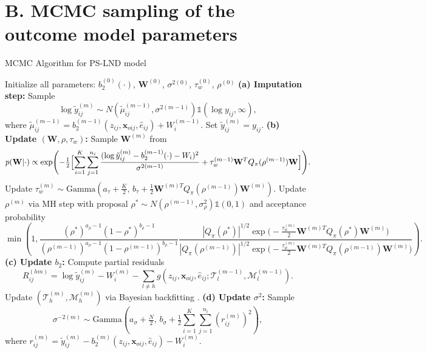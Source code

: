 \documentclass[aoas]{imsart}
\theoremstyle{plain}
\theoremstyle{definition}
\begin{document}
\newpage
\newpage


\section*{B. MCMC sampling of the outcome model parameters}



\begin{algorithm}[H]
\caption{MCMC Algorithm for PS-LND model}
\begin{algorithmic}[1]
\State Initialize all parameters: $b_2^{(0)}(\cdot)$, $\mathbf{W}^{(0)}$, $\sigma^{2(0)}$, $\tau_w^{(0)}$, $\rho^{(0)}$
    \Statex
    \State \textbf{(a) Imputation step:}
        \State Sample 
        \[
        \log \tilde{y}_{ij}^{(m)} \sim 
        N(\tilde{\mu}_{ij}^{(m-1)}, \sigma^{2(m-1)})
        \mathds{1}(\log y_{ij}, \infty),
        \]
        where $\tilde{\mu}_{ij}^{(m-1)} = b_2^{(m-1)}(z_{ij}, \mathbf{x}_{oij}, \hat{e}_{ij}) + W_i^{(m-1)}$.
    \Else
        \State Set $\tilde{y}_{ij}^{(m)} = y_{ij}$.
    \EndIf
    \Statex
    \State \textbf{(b) Update $(\mathbf{W},\rho,\tau_w)$:}
    \State Sample $\mathbf{W}^{(m)}$ from
    \[
    p(\mathbf{W}|\cdot) \propto \exp\Biggl(-\tfrac{1}{2}\Bigl[
    \sum_{i=1}^K \sum_{j=1}^{n_i} \frac{(\log \tilde{y}_{ij}^{(m)} - b_2^{(m-1)}(\cdot) - W_i)^2}{\sigma^{2(m-1)}}
    + \tau_w^{(m-1)} \mathbf{W}^T Q_\pi(\rho^{(m-1)}) \mathbf{W}
    \Bigr]\Biggr).
    \]
    \State Update $\tau_w^{(m)} \sim \text{Gamma}\!\left(a_\tau + \tfrac{K}{2},\, b_\tau + \tfrac{1}{2}\mathbf{W}^{(m)T} Q_\pi(\rho^{(m-1)}) \mathbf{W}^{(m)}\right)$.
    \State Update $\rho^{(m)}$ via MH step with proposal $\rho^* \sim N(\rho^{(m-1)}, \sigma_\rho^2)\mathds{1}(0,1)$ and acceptance probability
    \[
    \min\!\left(1, \frac{(\rho^*)^{a_\rho-1}(1-\rho^*)^{b_\rho-1}}{(\rho^{(m-1)})^{a_\rho-1}(1-\rho^{(m-1)})^{b_\rho-1}}
    \frac{|Q_\pi(\rho^*)|^{1/2} \exp\!\bigl(-\tfrac{\tau_w^{(m)}}{2}\mathbf{W}^{(m)T} Q_\pi(\rho^*) \mathbf{W}^{(m)}\bigr)}{|Q_\pi(\rho^{(m-1)})|^{1/2} \exp\!\bigl(-\tfrac{\tau_w^{(m)}}{2}\mathbf{W}^{(m)T} Q_\pi(\rho^{(m-1)}) \mathbf{W}^{(m)}\bigr)}\right).
    \]
    \Statex
    \State \textbf{(c) Update $b_2$:}
        \State Compute partial residuals
        \[
        R_{ij}^{(hm)} = \log \tilde{y}_{ij}^{(m)} - W_i^{(m)} - \sum_{l\neq h} g(z_{ij},\mathbf{x}_{oij},\hat{e}_{ij}; \mathcal{T}_l^{(m-1)}, \mathcal{M}_l^{(m-1)}).
        \]
        \State Update $(\mathcal{T}_h^{(m)},\mathcal{M}_h^{(m)})$ via Bayesian backfitting \parencite{Chipman10}.
    \EndFor
    \Statex
    \State \textbf{(d) Update $\sigma^2$:}
    \State Sample
    \[
    \sigma^{-2(m)} \sim \text{Gamma}\!\left(a_\sigma + \tfrac{N}{2},\, b_\sigma + \tfrac{1}{2}\sum_{i=1}^K\sum_{j=1}^{n_i}(r_{ij}^{(m)})^2\right),
    \]
    where $r_{ij}^{(m)} = \tilde{y}_{ij}^{(m)} - b_2^{(m)}(z_{ij}, \mathbf{x}_{oij}, \hat{e}_{ij}) - W_i^{(m)}$.
\EndFor
\end{algorithmic}
\end{algorithm}
\end{document}
